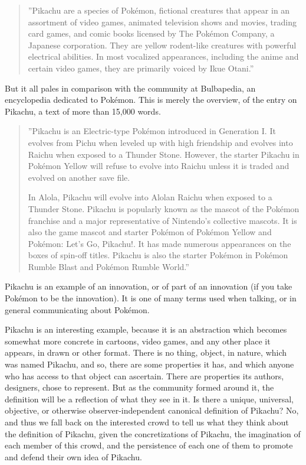 \documentclass[graybox,envcountchap,sectrefs]{svmono}
\begin{document}
\begin{quote}
''Pikachu are a species of Pok\'{e}mon, fictional creatures that appear in an assortment of video games, animated television shows and movies, trading card games, and comic books licensed by The Pok\'{e}mon Company, a Japanese corporation. They are yellow rodent-like creatures with powerful electrical abilities. In most vocalized appearances, including the anime and certain video games, they are primarily voiced by Ikue Otani.'' \cite{wikipedia-pikachu}
\end{quote}

But it all pales in comparison with the community at Bulbapedia, an encyclopedia dedicated to Pok\'{e}mon. This is merely the overview, of the entry on Pikachu, a text of more than 15,000 words.

\begin{quote}
''Pikachu is an Electric-type Pok\'{e}mon introduced in Generation I.
It evolves from Pichu when leveled up with high friendship and evolves into Raichu when exposed to a Thunder Stone. However, the starter Pikachu in Pok\'{e}mon Yellow will refuse to evolve into Raichu unless it is traded and evolved on another save file.

In Alola, Pikachu will evolve into Alolan Raichu when exposed to a Thunder Stone.
Pikachu is popularly known as the mascot of the Pok\'{e}mon franchise and a major representative of Nintendo's collective mascots.
It is also the game mascot and starter Pok\'{e}mon of Pok\'{e}mon Yellow and Pok\'{e}mon: Let's Go, Pikachu!. It has made numerous appearances on the boxes of spin-off titles. Pikachu is also the starter Pok\'{e}mon in Pok\'{e}mon Rumble Blast and Pok\'{e}mon Rumble World.'' \cite{bulbapedia-pikachu}
\end{quote}

Pikachu is an example of an innovation, or of part of an innovation (if you take Pok\'{e}mon to be the innovation). It is one of many terms used when talking, or in general communicating about Pok\'{e}mon. 

Pikachu is an interesting example, because it is an abstraction which becomes somewhat more concrete in cartoons, video games, and any other place it appears, in drawn or other format. There is no thing, object, in nature, which was named Pikachu, and so, there are some properties it has, and which anyone who has access to that object can ascertain. There are properties its authors, designers, chose to represent. But as the community formed around it, the definition will be a reflection of what they see in it. Is there a unique, universal, objective, or otherwise observer-independent canonical definition of Pikachu? No, and thus we fall back on the interested crowd to tell us what they think about the definition of Pikachu, given the concretizations of Pikachu, the imagination of each member of this crowd, and the persistence of each one of them to promote and defend their own idea of Pikachu.
\end{document}
